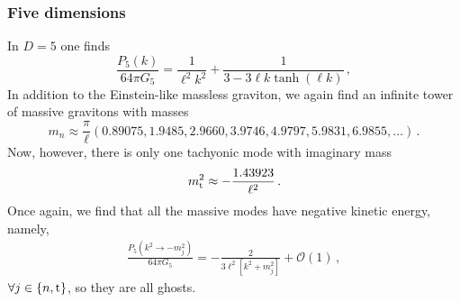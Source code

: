 \documentclass[11pt]{article}
\begin{document}
{\subsubsection{Five dimensions}
In $D=5$ one finds
\begin{equation}
\frac{P_{5}(k)}{64\pi G_5}=\frac{1}{\ell^2 k^2}+\frac{1}{3-3 \ell k \tanh (\ell k)}\, ,
\end{equation}
In addition to the Einstein-like massless graviton, we again find an infinite tower of massive gravitons with masses
 \begin{equation}
 m_n\approx \frac{\pi}{\ell} (0.89075, 1.9485, 2.9660, 3.9746, 4.9797, 5.9831, 6.9855,\dots)\,.
 \end{equation}
Now, however, there is only one tachyonic mode with imaginary mass
 \begin{equation}
 m^2_{\rm t}\approx -\frac{1.43923}{\ell^2}\, .
 \end{equation}
Once again, we find that all the massive modes have negative kinetic energy, namely,
 \begin{align}
\frac{P_{5}(k^2\rightarrow -m_j^2  )}{64\pi G_5}=-\frac{2}{3\ell^2 [k^2+m_j^2]}+\mathcal{O}(1) \, ,
\end{align}
 $\forall j\in \{n, {\rm t}\}$, so they are all ghosts. %

}
\end{document}
